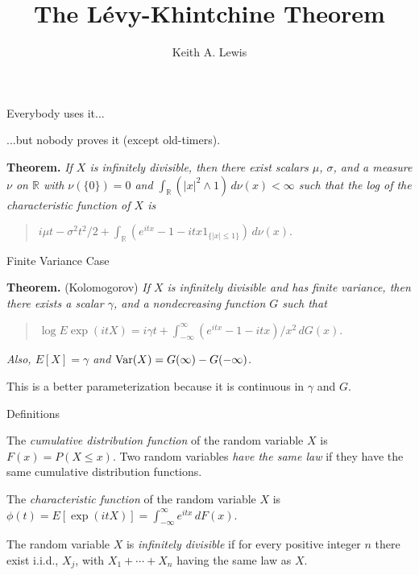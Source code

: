 \documentclass{amsart}
\title{The L\'evy-Khintchine Theorem}
\author{Keith A. Lewis}
\newcommand{\RR}{\mathbb{R}}
\newcommand{\Var}{\mathop{\rm Var}}
\begin{document}
\maketitle

\begin{section}{Everybody uses it...}

...but nobody proves it (except old-timers).

\medskip

{\bf Theorem.} {\it
If $X$ is infinitely divisible, then there exist scalars
$\mu$, $\sigma$, and a measure $\nu$ on $\RR$ with
$\nu(\{0\}) = 0$ and $\int_\RR (|x|^2\wedge 1)\,d\nu(x) < \infty$
such that the log of the characteristic function of $X$ is}

\begin{quote}
$
	i\mu t - \sigma^2 t^2/2
		+ \int_\RR (e^{itx} - 1 - itx 1_{\{|x|\le1\}})\,d\nu(x).
$
\end{quote}

\end{section}

\begin{section}{Finite Variance Case}

{\bf Theorem.} (Kolomogorov) {\it
If $X$ is infinitely divisible and has finite variance,
then there exists a scalar
$\gamma$, and a nondecreasing function $G$ such that}

\begin{quote}
$
	\log E\exp(itX) = i\gamma t + \int_{-\infty}^\infty (e^{itx} - 1 - itx)/x^2\,dG(x).
$
\end{quote}
{\it Also, $E[X] = \gamma$ and $\Var(X) = G(\infty) - G(-\infty)$.}

\medskip

This is a better parameterization because it is continuous
in $\gamma$ and $G$.

\end{section}

\begin{section}{Definitions}

The {\it cumulative distribution function} of the random variable
$X$ is $F(x) = P(X\le x)$.
Two random variables {\it have the same law} if they have the
same cumulative distribution functions.

\medskip

The {\it characteristic function} of the random variable $X$ is
$\phi(t) = E[\exp(itX)] = \int_{-\infty}^\infty e^{itx}\,dF(x)$.

\medskip

The random variable $X$ is {\it infinitely divisible} if for every
positive integer $n$ there exist i.i.d., $X_j$, with
$X_1 + \cdots + X_n$ having the same law as $X$.

\end{section}
\end{document}
